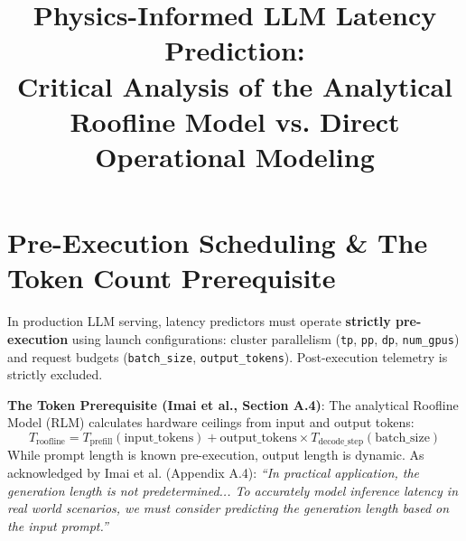 \documentclass[10pt,a4paper]{article}
\title{\vspace{-2.8em}\textbf{\large Physics-Informed LLM Latency Prediction:}\\[0.1em]
\large Critical Analysis of the Analytical Roofline Model vs. Direct Operational Modeling}
\author{}
\date{}
\begin{document}
\maketitle
\vspace{-4.2em}

\section*{Pre-Execution Scheduling \& The Token Count Prerequisite}
In production LLM serving, latency predictors must operate \textbf{strictly pre-execution} using launch configurations: cluster parallelism (\texttt{tp}, \texttt{pp}, \texttt{dp}, \texttt{num\_gpus}) and request budgets (\texttt{batch\_size}, \texttt{output\_tokens}). Post-execution telemetry is strictly excluded.

\vspace{-0.3em}
\noindent \textbf{The Token Prerequisite (Imai et al., Section A.4)}: The analytical Roofline Model (RLM) calculates hardware ceilings from input and output tokens:
\begin{equation}
    T_{\text{roofline}} = T_{\text{prefill}}(\text{input\_tokens}) + \text{output\_tokens} \times T_{\text{decode\_step}}(\text{batch\_size})
\end{equation}
While prompt length is known pre-execution, output length is dynamic. As acknowledged by Imai et al. (Appendix A.4): \textit{``In practical application, the generation length is not predetermined... To accurately model inference latency in real world scenarios, we must consider predicting the generation length based on the input prompt.''}
\end{document}
